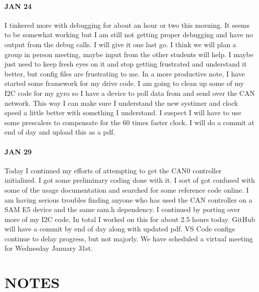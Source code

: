\documentclass{article}
\begin{document}
\paragraph{JAN 24}
I tinkered more with debugging for about an hour or two this morning. It seems to be somewhat working but I am still not getting proper debugging and have no output from the debug calls. I will give it one last go. I think we will plan a group in person meeting, maybe input from the other students will help. I maybe just need to keep fresh eyes on it and stop getting frustrated and understand it better, but config files are frustrating to me. In a more productive note, I have started some framework for my drive code. I am going to clean up some of my I2C code for my gyro so I have a device to poll data from and send over the CAN network. This way I can make sure I understand the new systimer and clock speed a little better with something I understand. I suspect I will have to use some prescalers to compensate for the 60 times faster clock. I will do a commit at end of day and upload this as a pdf. 

\paragraph{JAN 29}
Today I continued my efforts of attempting to get the CAN0 controller initialized. I got some preliminary coding done with it. I sort of got confused with some of the usage documentation and searched for some reference code online. I am having serious troubles finding anyone who has used the CAN controller on a SAM E5 device and the same sam.h dependency. I continued by porting over more of my I2C code. In total I worked on this for about 2.5 hours today. GitHub will have a commit by end of day along with updated pdf. VS Code configs continue to delay progress, but not majorly. We have scheduled a virtual meeting for Wednesday January 31st.
\section{NOTES}

\end{document}

